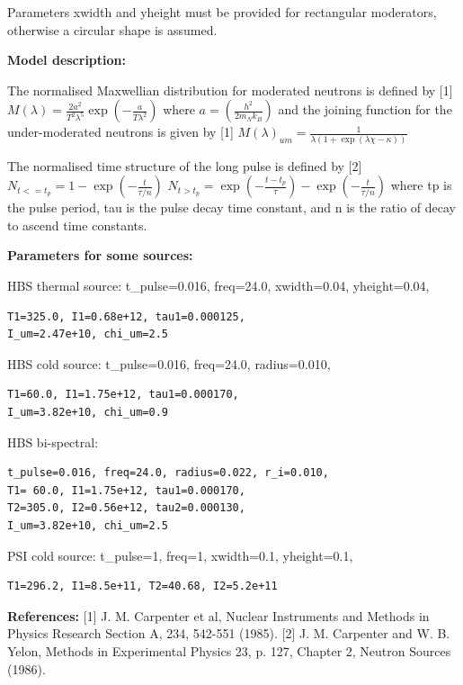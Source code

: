 Parameters xwidth and yheight must be provided for rectangular moderators, otherwise a circular shape is assumed.

\textbf{Model description:}

The normalised Maxwellian distribution for moderated neutrons is defined by [1] $M(\lambda)=\frac{2a^2}{T^2\lambda^5}\exp\left(-\frac{a}{T\lambda^{2}}\right)$ where $a=\left(\frac{h^2}{2m_{N}k_{B}}\right)$ and the joining function for the under-moderated neutrons is given by [1] $M(\lambda)_{um}=\frac{1}{\lambda(1+\exp(\lambda\chi-\kappa))}$

The normalised time structure of the long pulse is defined by [2] $N_{t<=t_p}=1-\exp\left(-\frac{t}{\tau/n}\right)$ $N_{t>t_p}=\exp\left(-\frac{t-t_p}{\tau}\right)-\exp\left(-\frac{t}{\tau/n}\right)$ where tp is the pulse period, tau is the pulse decay time constant, and n is the ratio of decay to ascend time constants.

\textbf{Parameters for some sources:}

HBS thermal source: t\_pulse=0.016, freq=24.0, xwidth=0.04, yheight=0.04,

\begin{verbatim}
T1=325.0, I1=0.68e+12, tau1=0.000125,
I_um=2.47e+10, chi_um=2.5
\end{verbatim}

HBS cold source: t\_pulse=0.016, freq=24.0, radius=0.010,

\begin{verbatim}
T1=60.0, I1=1.75e+12, tau1=0.000170,
I_um=3.82e+10, chi_um=0.9
\end{verbatim}

HBS bi-spectral:

\begin{verbatim}
t_pulse=0.016, freq=24.0, radius=0.022, r_i=0.010,
T1= 60.0, I1=1.75e+12, tau1=0.000170,
T2=305.0, I2=0.56e+12, tau2=0.000130,
I_um=3.82e+10, chi_um=2.5
\end{verbatim}

PSI cold source: t\_pulse=1, freq=1, xwidth=0.1, yheight=0.1,

\begin{verbatim}
T1=296.2, I1=8.5e+11, T2=40.68, I2=5.2e+11
\end{verbatim}

\textbf{References:} [1] J. M. Carpenter et al, Nuclear Instruments and Methods in Physics Research Section A, 234, 542-551 (1985). [2] J. M. Carpenter and W. B. Yelon, Methods in Experimental Physics 23, p. 127, Chapter 2, Neutron Sources (1986).

